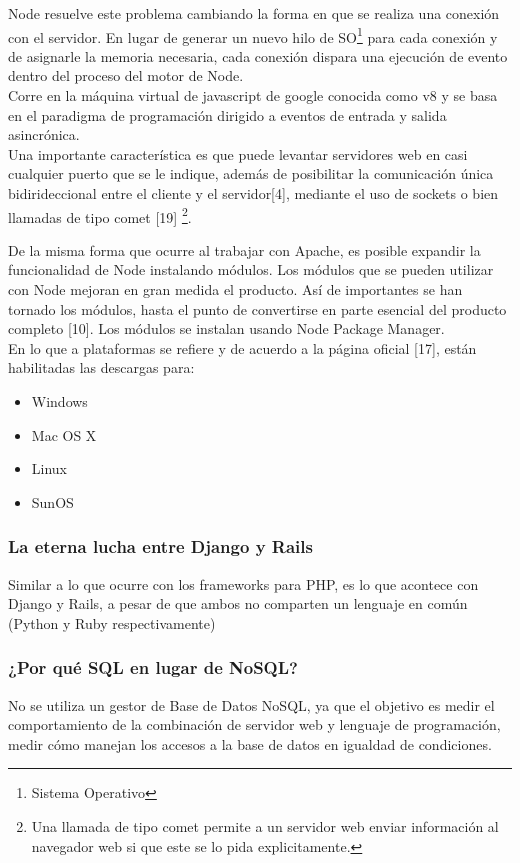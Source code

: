 Node resuelve este problema cambiando la forma en que se realiza una conexión con el servidor. En lugar de 
generar un nuevo hilo de SO\footnote{Sistema Operativo} para cada conexión y de asignarle la memoria necesaria, 
cada conexión dispara una ejecución de evento dentro del proceso del motor de Node.\\

Corre en la máquina virtual de javascript de google conocida como v8 y se basa en el paradigma
de programación dirigido a eventos de entrada y salida asincrónica.\\

Una importante característica es que puede levantar servidores web en casi cualquier puerto que se 
le indique, además de posibilitar la comunicación única bidirideccional entre el cliente y el servidor[4],
mediante el uso de sockets o bien llamadas de tipo comet [19] \footnote{Una llamada de tipo comet 
permite a un servidor web enviar información al navegador web si que este se lo pida explicitamente.}.


De la misma forma que ocurre al trabajar con Apache, es posible expandir la funcionalidad de Node 
instalando módulos. Los módulos que se pueden utilizar con Node mejoran en gran medida el producto.
Así de importantes se han tornado los módulos, hasta el punto de convertirse en parte esencial del 
producto completo [10]. Los módulos se instalan usando Node Package Manager.\\

En lo que a plataformas se refiere y de acuerdo a la página oficial [17], están habilitadas las 
descargas para:
\begin{itemize}
 \item Windows
 \item Mac OS X
 \item Linux
 \item SunOS
\end{itemize}


\subsubsection{La eterna lucha entre Django y Rails}

Similar a lo que ocurre con los frameworks para PHP, es lo que acontece con Django y Rails, a pesar
de que ambos no comparten un lenguaje en común (Python y Ruby respectivamente)


\subsubsection{¿Por qué SQL en lugar de NoSQL?}
No se utiliza un gestor de Base de Datos NoSQL, ya que el objetivo es medir el comportamiento de
la combinación de servidor web y lenguaje de programación, medir cómo manejan los accesos a la base 
de datos en igualdad de condiciones.\\
\newpage


